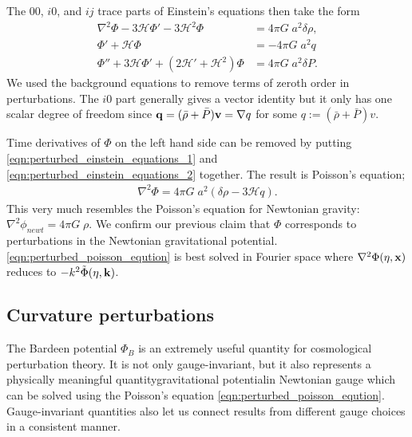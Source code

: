 The $00$, $i0$, and $ij$ trace parts of Einstein's equations then take the form
\begin{align}
	\nabla^2 \Phi - 3 \mathcal{H} \Phi' - 3\mathcal{H}^2 \Phi &= 4\pi G \; a^2 \delta\rho, \label{eqn:perturbed_einstein_equations_1}\\
	\Phi' + \mathcal{H} \Phi &= -4\pi G \; a^2 q \label{eqn:perturbed_einstein_equations_2}\\
	\Phi'' + 3\mathcal{H} \Phi' + (2\mathcal{H}' + \mathcal{H}^2) \Phi &= 4\pi G \; a^2 \delta P. \label{eqn:perturbed_einstein_equations_3}
\end{align}
We used the background equations to remove terms of zeroth order in perturbations. The $i0$ part generally gives a vector identity but it only has one scalar degree of freedom since $\mathbf{q}=(\bar{\rho}+\bar{P})\mathbf{v} = \nabla q$ for some $q := (\bar{\rho}+\bar{P}) v$.

Time derivatives of $\Phi$ on the left hand side can be removed by putting \eqref{eqn:perturbed_einstein_equations_1} and \eqref{eqn:perturbed_einstein_equations_2} together. The result is Poisson's equation;
\begin{align}
	\nabla^2 \Phi = 4\pi G \; a^2 (\delta\rho - 3\mathcal{H}q). \label{eqn:perturbed_poisson_eqution}
\end{align}
This very much resembles the Poisson's equation for Newtonian gravity: $\nabla^2 \phi_{newt} = 4\pi G \; \rho$. We confirm our previous claim that $\Phi$ corresponds to perturbations in the Newtonian gravitational potential. \eqref{eqn:perturbed_poisson_eqution} is best solved in Fourier space where $\nabla^2\Phi(\eta,\mathbf{x})$ reduces to $-k^2 \tilde{\Phi}(\eta,\mathbf{k})$.


\subsection{Curvature perturbations}

The Bardeen potential $\Phi_B$ is an extremely useful quantity for cosmological perturbation theory. It is not only gauge-invariant, but it also represents a physically meaningful quantity\textemdash gravitational potential\textemdash in Newtonian gauge which can be solved using the Poisson's equation \eqref{eqn:perturbed_poisson_eqution}. Gauge-invariant quantities also let us connect results from different gauge choices in a consistent manner.

